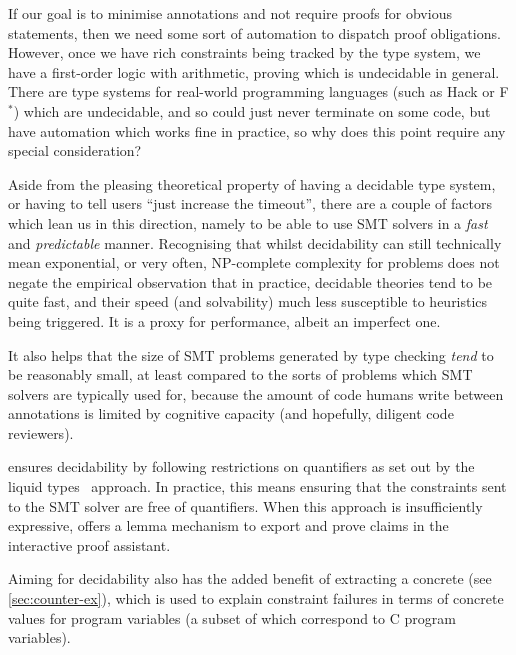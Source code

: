 If our goal is to minimise annotations and not require proofs for obvious
statements, then we need some sort of automation to dispatch proof
obligations. However, once we have rich constraints being tracked by the type
system, we have a first-order logic with arithmetic, proving which is
undecidable in general. There are type systems for real-world
programming languages (such as Hack or F$^*$) which are undecidable, and so
could just never terminate on some code, but have automation which works fine
in practice, so why does this point require any special consideration?

Aside from the pleasing theoretical property of having a decidable type system,
or having to tell users ``just increase the timeout'',  there are a couple of
factors which lean us in this direction, namely to be able to use SMT solvers
in a \emph{fast} and \emph{predictable} manner. Recognising that whilst
decidability can still technically mean exponential, or very often, NP-complete
complexity for problems does not negate the empirical observation that in
practice, decidable theories tend to be quite fast, and their speed (and
solvability) much less susceptible to heuristics being triggered. It is a proxy
for performance, albeit an imperfect one.

It also helps that the size of SMT problems generated by type checking
\emph{tend} to be reasonably small, at least compared to the sorts of problems
which SMT solvers are typically used for, because the amount of code humans
write between annotations is limited by cognitive capacity (and hopefully,
diligent code reviewers).

 ensures decidability by following restrictions on quantifiers as set
out by the liquid types~ approach. In practice, this
means ensuring that the constraints sent to the SMT solver are free of
quantifiers. When this approach is insufficiently expressive,  offers a
lemma mechanism to export and prove claims in the  interactive proof
assistant.

Aiming for decidability also has the added benefit of extracting a concrete
 (see \cref{sec:counter-ex}), which is used to explain
constraint failures in terms of concrete values for  program variables
(a subset of which correspond to C program variables).

